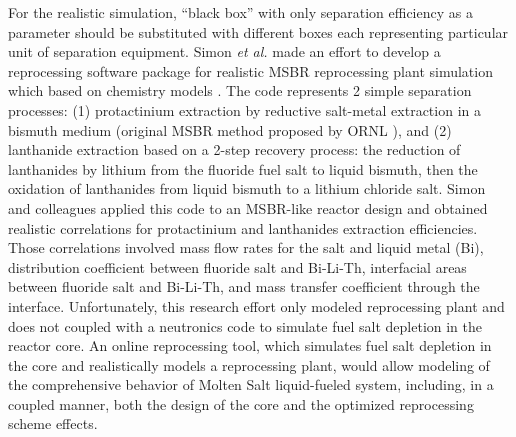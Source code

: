 For the realistic simulation, ``black box'' with only separation efficiency 
as a parameter should be substituted with different boxes each representing 
particular unit of
separation equipment. Simon \emph{et al.} made an effort to develop a 
reprocessing software package for realistic \gls{MSBR} reprocessing 
plant simulation which based on chemistry models \cite{simon_-line_2008}. 
The code represents 2 simple separation processes: (1)  protactinium 
extraction by reductive salt-metal extraction in a bismuth medium (original 
\gls{MSBR} method proposed by \gls{ORNL} \cite{whatley_engineering_1970-1}), 
and (2) lanthanide extraction based on a 2-step recovery process:  
the reduction of 
lanthanides by lithium from the fluoride fuel salt to liquid bismuth, then the 
oxidation of lanthanides from liquid bismuth to a lithium chloride salt. Simon and 
colleagues applied this code to an \gls{MSBR}-like reactor design and 
obtained realistic 
correlations for protactinium and lanthanides extraction efficiencies. Those 
correlations involved mass flow rates for the salt and liquid metal (Bi), 
distribution coefficient between fluoride salt and Bi-Li-Th, interfacial areas 
between fluoride salt and Bi-Li-Th, and mass transfer coefficient through the 
interface. Unfortunately, this research effort only modeled reprocessing plant 
and does not coupled with a neutronics code to simulate fuel salt depletion in 
the reactor core. An online reprocessing tool, which simulates fuel salt 
depletion in the core and realistically models a reprocessing plant, 
would allow modeling of the comprehensive behavior of 
Molten Salt liquid-fueled system, including, in a coupled manner, both the 
design of the core and the optimized reprocessing scheme effects.
